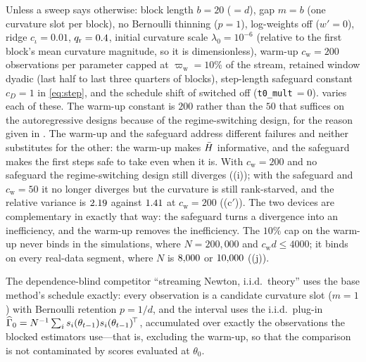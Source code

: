 Unless a sweep says otherwise: block length $b=20$ ($=d$), gap $m=b$ (one curvature slot per
block), no Bernoulli thinning ($p=1$), log-weights off ($w'=0$), ridge $c_\iota=0.01$,
$q_{\mathrm r}=0.4$, initial curvature scale $\lambda_0=10^{-6}$ (relative to the first block's mean
curvature magnitude, so it is dimensionless), warm-up $c_{\mathrm w}=200$ observations per
parameter capped at $\varpi_{\mathrm w}=10\%$ of the stream, retained window dyadic (last half to
last three quarters of blocks), step-length safeguard constant $c_D=1$ in \eqref{eq:step}, and the
schedule shift of  switched off (\texttt{t0\_mult}$\,=0$).
 varies each of these. The warm-up constant is $200$ rather than the $50$
that suffices on the autoregressive designs because of the regime-switching design, for the
reason given in . The warm-up and the safeguard address different failures and
neither substitutes for the other: the warm-up makes $\bar{H}$ informative, and the safeguard makes
the first steps safe to take even when it is. With $c_{\mathrm w}=200$ and no safeguard the
regime-switching design still diverges ((i)); with the safeguard and
$c_{\mathrm w}=50$ it no longer diverges but the curvature is still rank-starved, and the relative
variance is $2.19$ against $1.41$ at $c_{\mathrm w}=200$
((c$'$)). The two devices are complementary in exactly that way: the safeguard
turns a divergence into an inefficiency, and the warm-up removes the inefficiency. The $10\%$ cap on the warm-up never binds
in the simulations, where $N=200{,}000$ and $c_{\mathrm w}d\le 4000$; it binds on every real-data
segment, where $N$ is $8{,}000$ or $10{,}000$ ((j)).

The dependence-blind competitor ``streaming Newton, i.i.d.\ theory'' uses the base method's
schedule exactly: every observation is a candidate curvature slot ($m=1$) with Bernoulli
retention $p=1/d$, and the interval uses the i.i.d.\ plug-in
$\widehat{\Gamma}_0=N^{-1}\sum_i s_i(\theta_{t-1})s_i(\theta_{t-1})^{\!\top}$, accumulated over exactly the
observations the blocked estimators use---that is, excluding the warm-up, so that the
comparison is not contaminated by scores evaluated at $\theta_0$.

